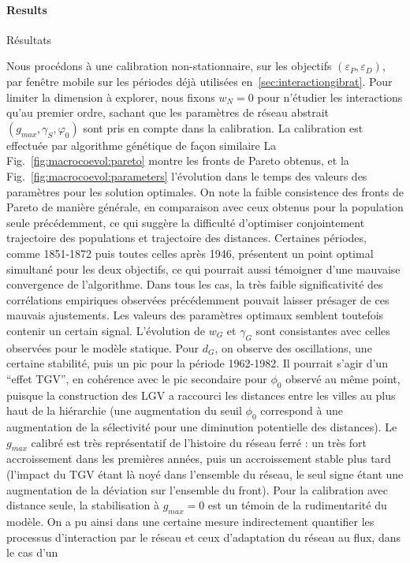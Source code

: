 



\paragraph{Results}{Résultats}


Nous procédons à une calibration non-stationnaire, sur les objectifs $(\varepsilon_P,\varepsilon_D)$, par fenêtre mobile sur les périodes déjà utilisées en~\ref{sec:interactiongibrat}. Pour limiter la dimension à explorer, nous fixons $w_N = 0$ pour n'étudier les interactions qu'au premier ordre, sachant que les paramètres de réseau abstrait $(g_{max},\gamma_S,\varphi_0)$ sont pris en compte dans la calibration. La calibration est effectuée par algorithme génétique de façon similaire La Fig.~\ref{fig:macrocoevol:pareto} montre les fronts de Pareto obtenus, et la Fig.~\ref{fig:macrocoevol:parameters} l'évolution dans le temps des valeurs des paramètres pour les solution optimales. On note la faible consistence des fronts de Pareto de manière générale, en comparaison avec ceux obtenus pour la population seule précédemment, ce qui suggère la difficulté d'optimiser conjointement trajectoire des populations et trajectoire des distances. Certaines périodes, comme 1851-1872 puis toutes celles après 1946, présentent un point optimal simultané pour les deux objectifs, ce qui pourrait aussi témoigner d'une mauvaise convergence de l'algorithme. Dans tous les cas, la très faible significativité des corrélations empiriques observées précédemment pouvait laisser présager de ces mauvais ajustements. Les valeurs des paramètres optimaux semblent toutefois contenir un certain signal. L'évolution de $w_G$ et $\gamma_G$ sont consistantes avec celles observées pour le modèle statique. Pour $d_G$, on observe des oscillations, une certaine stabilité, puis un pic pour la période 1962-1982. Il pourrait s'agir d'un ``effet TGV'', en cohérence avec le pic secondaire pour $\phi_0$ observé au même point, puisque la construction des LGV a raccourci les distances entre les villes au plus haut de la hiérarchie (une augmentation du seuil $\phi_0$ correspond à une augmentation de la sélectivité pour une diminution potentielle des distances). Le $g_{max}$ calibré est très représentatif de l'histoire du réseau ferré : un très fort accroissement dans les premières années, puis un accroissement stable plus tard (l'impact du TGV étant là noyé dans l'ensemble du réseau, le seul signe étant une augmentation de la déviation sur l'ensemble du front). Pour la calibration avec distance seule, la stabilisation à $g_{max}=0$ est un témoin de la rudimentarité du modèle. On a pu ainsi dans une certaine mesure indirectement quantifier les processus d'interaction par le réseau et ceux d'adaptation du réseau au flux, dans le cas d'un 